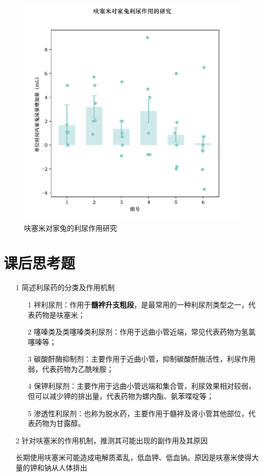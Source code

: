 \documentclass[UTF8]{ctexart}
\begin{document}
\begin{figure}[H]
    \centering
    \includegraphics{figure-9_svg.pdf}
    \caption{呋塞米对家兔的利尿作用研究}
\end{figure}

\section{课后思考题}

\begin{itemize}
    \item [1] 简述利尿药的分类及作用机制

    \begin{itemize}
        \item [1] 袢利尿剂：作用于\textbf{髓袢升支粗段}，是最常用的一种利尿剂类型之一，代表药物是呋塞米；
        \item [2] 噻嗪类及类噻嗪类利尿剂：作用于远曲小管近端，常见代表药物为氢氯噻嗪等；
        \item [3] 碳酸酐酶抑制剂：主要作用于近曲小管，抑制碳酸酐酶活性，利尿作用弱，代表药物为乙酰唑胺；
        \item [4] 保钾利尿剂：主要作用于远曲小管远端和集合管，利尿效果相对较弱，但可以减少钾的排出量，代表药物为螺内酯、氨苯喋啶等；
        \item [5] 渗透性利尿剂：也称为脱水药，主要作用于髓袢及肾小管其他部位，代表药物为甘露醇。
    \end{itemize}

    \item [2] 针对呋塞米的作用机制，推测其可能出现的副作用及其原因

        长期使用呋塞米可能造成电解质紊乱，低血钾、低血钠。原因是呋塞米使得大量的钾和钠从人体排出
\end{itemize}
\end{document}
